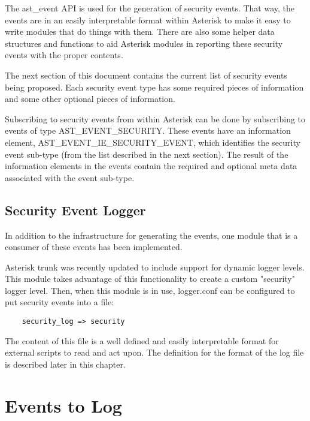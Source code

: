     The ast\_event API is used for the generation of security events.  That
way, the events are in an easily interpretable format within Asterisk to
make it easy to write modules that do things with them.  There are also some
helper data structures and functions to aid Asterisk modules in reporting these
security events with the proper contents.

    The next section of this document contains the current list of security events
being proposed.  Each security event type has some required pieces of
information and some other optional pieces of information.

    Subscribing to security events from within Asterisk can be done by
subscribing to events of type AST\_EVENT\_SECURITY.  These events have an
information element, AST\_EVENT\_IE\_SECURITY\_EVENT, which identifies the security
event sub-type (from the list described in the next section).  The result of the
information elements in the events contain the required and optional meta data
associated with the event sub-type.

\subsection{Security Event Logger}

    In addition to the infrastructure for generating the events, one module that
is a consumer of these events has been implemented.

    Asterisk trunk was recently updated to include support for dynamic logger
levels.  This module takes advantage of this functionality to create a
custom "security" logger level.  Then, when this module is in use, logger.conf
can be configured to put security events into a file:

\begin{verbatim}
    security_log => security
\end{verbatim}

    The content of this file is a well defined and easily interpretable
format for external scripts to read and act upon.  The definition for the format
of the log file is described later in this chapter.

\section{Events to Log}

